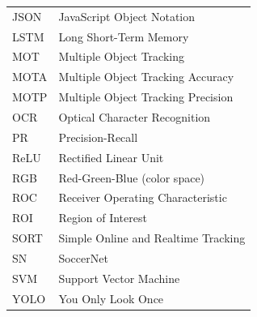 \begin{table}[H]
\begin{tabular}{@{}ll@{}}
        JSON    & JavaScript Object Notation \\
        LSTM    & Long Short-Term Memory \\
        MOT     & Multiple Object Tracking \\
        MOTA    & Multiple Object Tracking Accuracy \\
        MOTP    & Multiple Object Tracking Precision \\
        OCR     & Optical Character Recognition \\
        PR      & Precision-Recall \\
        ReLU    & Rectified Linear Unit \\
        RGB     & Red-Green-Blue (color space) \\
        ROC     & Receiver Operating Characteristic \\
        ROI     & Region of Interest \\
        SORT    & Simple Online and Realtime Tracking \\
        SN      & SoccerNet \\
        SVM     & Support Vector Machine \\
        YOLO    & You Only Look Once \\
        \bottomrule
    \end{tabular}
\end{table}
